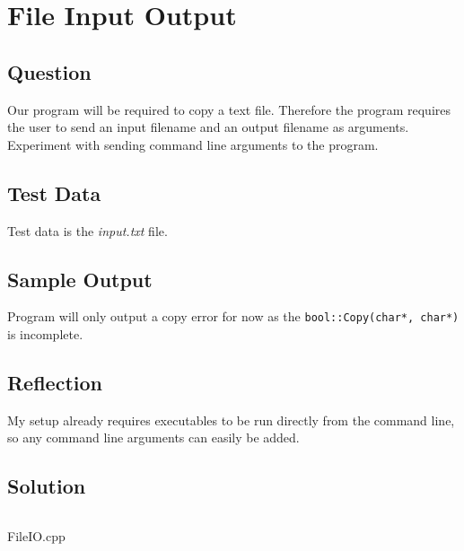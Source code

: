 \section{File Input Output}
    \subsection*{Question}
        Our program will be required to copy a text file. Therefore the program requires the user to send an input filename and an output filename as arguments.
        Experiment with sending command line arguments to the program.
            
    \subsection*{Test Data}
        Test data is the \textit{input.txt} file.
        
    \subsection*{Sample Output}
        Program will only output a copy error for now as the \texttt{bool::Copy(char*, char*)}
        is incomplete.

    \subsection*{Reflection}
        My setup already requires executables to be run directly from the command line,
        so any command line arguments can easily be added.
        
    \subsection*{Solution}
        \begin{listing}[H]
            \inputminted[firstline=5]{cpp}{../Tasks/01-FileIO/FileIO.cpp}%
            \caption{FileIO.cpp}
        \end{listing}